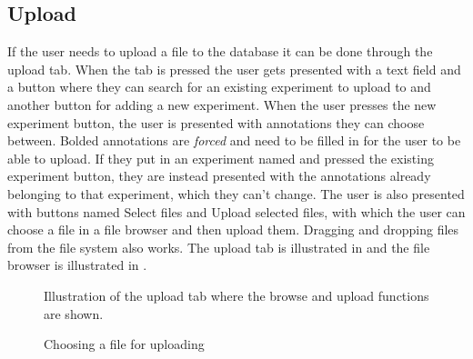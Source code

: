 \subsection{Upload}
If the user needs to upload a file to the database it can be done through the upload tab.
When the tab is pressed the user gets presented with a text field and a button where they can search for an existing experiment to upload to and another button for adding a new experiment. When the user presses the new experiment button, the user is presented with annotations they can choose between. Bolded annotations are {\em forced} and need to be filled in for the user to be able to upload. If they put in an experiment named and pressed the existing experiment button, they are instead presented with the annotations already belonging to that experiment, which they can't change. The user is also presented with buttons named Select files and Upload selected files, with which the user can choose a file in a file browser and then upload them. Dragging and dropping files from the file system also works. The upload tab is illustrated in  and the file browser is illustrated in .
\begin{figure}[htb]
	\caption{Illustration of the upload tab where the browse and upload functions are shown.}
	\label{fig:des_upload-view}
\end{figure}

\begin{figure}[htb]
	\caption{Choosing a file for uploading}
	\label{fig:des_upload}
\end{figure}
\FloatBarrier

